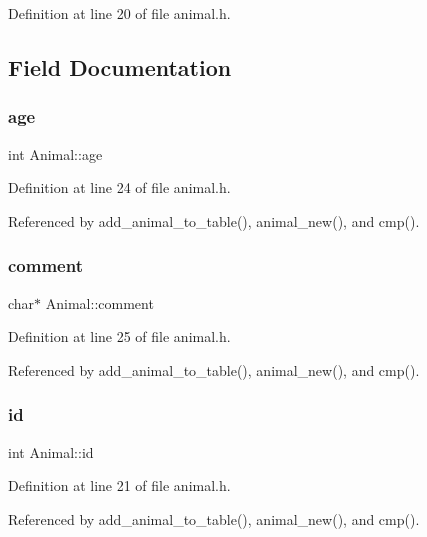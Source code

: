 Definition at line 20 of file animal.\+h.



\subsection{Field Documentation}
\mbox{\label{struct_animal_a31e4a23bef9596927496de4eb6b9c721}} 
\subsubsection{\texorpdfstring{age}{age}}
{\footnotesize\ttfamily int Animal\+::age}



Definition at line 24 of file animal.\+h.



Referenced by add\+\_\+animal\+\_\+to\+\_\+table(), animal\+\_\+new(), and cmp().

\mbox{\label{struct_animal_a6e65a2d3d4dff6a58459fc211e5470c4}} 
\subsubsection{\texorpdfstring{comment}{comment}}
{\footnotesize\ttfamily char$\ast$ Animal\+::comment}



Definition at line 25 of file animal.\+h.



Referenced by add\+\_\+animal\+\_\+to\+\_\+table(), animal\+\_\+new(), and cmp().

\mbox{\label{struct_animal_a0e1e797aa638af5d8276bcf12fad9a1f}} 
\subsubsection{\texorpdfstring{id}{id}}
{\footnotesize\ttfamily int Animal\+::id}



Definition at line 21 of file animal.\+h.



Referenced by add\+\_\+animal\+\_\+to\+\_\+table(), animal\+\_\+new(), and cmp().


